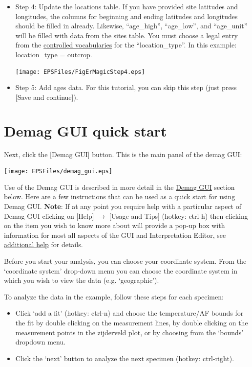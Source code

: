 \documentclass[11pt]{book}
\begin{document}
{\begin{itemize}
\texttt{[image: EPSFiles/FigErMagicStep3.eps]}


\item Step 4: Update the locations table.  If you have provided site latitudes and longitudes, the columns for beginning and ending latitudes and longitudes should be filled in already. Likewise, ``age_high'', ``age_low'', and ``age_unit'' will be filled with data from the sites table.  You must choose a legal entry from the \href{http://earthref.org/MAGIC/shortlists.htm}{controlled vocabularies} for the  ``location\_type''. In this example: location\_type = outcrop.

\texttt{[image: EPSFiles/FigErMagicStep4.eps]}

\item Step 5: Add ages data.  For this tutorial, you can skip this step (just press [Save and continue]).

\end{itemize}


\section{Demag GUI quick start}
\label{sect:demag_gui}

Next, click the [Demag GUI] button.  This is the main panel of the demag GUI:

\texttt{[image: EPSFiles/demag\_gui.eps]}

Use of the Demag GUI is described in more detail in the \href{#demag_gui.py}{Demag GUI} section below. Here are a few instructions that can be used as a quick start for using Demag GUI. {\bf Note}: If at any point you require help with a particular aspect of Demag GUI clicking on [Help] $\rightarrow$ [Usage and Tips] (hotkey: ctrl-h) then clicking on the item you wish to know more about will provide a pop-up box with information for most all aspects of the GUI and Interpretation Editor, see \hyperref[add-help]{additional help} for details.

Before you start your analysis, you can choose your coordinate system.  From the `coordinate system' drop-down menu you can choose the coordinate system in which you wish to view the data (e.g.  `geographic').

To analyze the data in the example, follow these steps for each specimen:
\begin{itemize}
\item Click `add a fit' (hotkey: ctrl-n) and choose the temperature/AF bounds for the fit by double clicking on the measurement lines, by double clicking on the measurement points in the zijderveld plot, or by choosing from the `bounds' dropdown menu.
\item Click the `next' button to analyze the next specimen (hotkey: ctrl-right).
\end{itemize}

}
\end{document}
